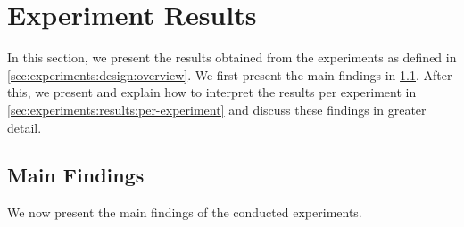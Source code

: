 \section{Experiment Results}
\label{sec:experiments:results}

In this section, we present the results obtained from the experiments as defined in \cref{sec:experiments:design:overview}. We first present the main findings in \cref{sec:experiments:main-findings}. After this, we present and explain how to interpret the results per experiment in \cref{sec:experiments:results:per-experiment} and discuss these findings in greater detail.

\subsection{Main Findings}
\label{sec:experiments:main-findings}

We now present the main findings of the conducted experiments.

